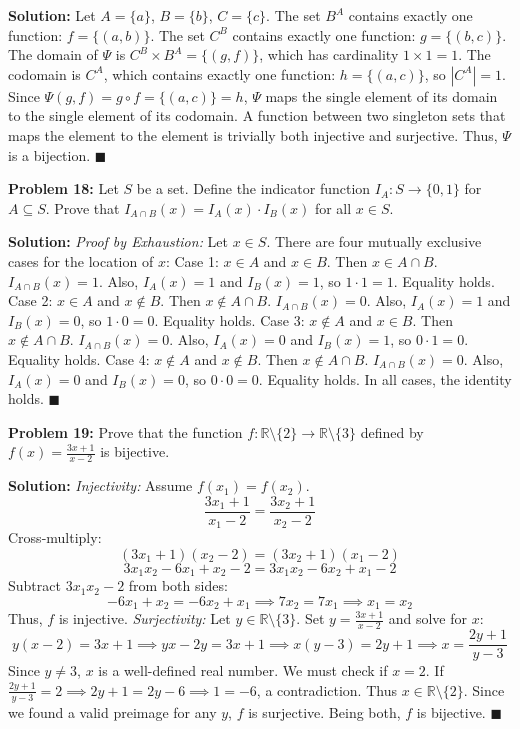 \documentclass[11pt, letterpaper]{article}
\theoremstyle{definition}
\theoremstyle{remark}
\newcommand{\R}{\mathbb{R}}
\begin{document}
\textbf{Solution:}
Let $A = \{a\}$, $B = \{b\}$, $C = \{c\}$. 
The set $B^A$ contains exactly one function: $f = \{(a, b)\}$.
The set $C^B$ contains exactly one function: $g = \{(b, c)\}$.
The domain of $\Psi$ is $C^B \times B^A = \{(g, f)\}$, which has cardinality $1 \times 1 = 1$.
The codomain is $C^A$, which contains exactly one function: $h = \{(a, c)\}$, so $|C^A| = 1$.
Since $\Psi(g, f) = g \circ f = \{(a, c)\} = h$, $\Psi$ maps the single element of its domain to the single element of its codomain. A function between two singleton sets that maps the element to the element is trivially both injective and surjective. Thus, $\Psi$ is a bijection. \hfill $\blacksquare$

\vspace{1em}
\textbf{Problem 18:} Let $S$ be a set. Define the indicator function $I_A: S \to \{0, 1\}$ for $A \subseteq S$. Prove that $I_{A \cap B}(x) = I_A(x) \cdot I_B(x)$ for all $x \in S$.

\textbf{Solution:}
\textit{Proof by Exhaustion:} Let $x \in S$. There are four mutually exclusive cases for the location of $x$:
Case 1: $x \in A$ and $x \in B$. Then $x \in A \cap B$. $I_{A \cap B}(x) = 1$. Also, $I_A(x) = 1$ and $I_B(x) = 1$, so $1 \cdot 1 = 1$. Equality holds.
Case 2: $x \in A$ and $x \notin B$. Then $x \notin A \cap B$. $I_{A \cap B}(x) = 0$. Also, $I_A(x) = 1$ and $I_B(x) = 0$, so $1 \cdot 0 = 0$. Equality holds.
Case 3: $x \notin A$ and $x \in B$. Then $x \notin A \cap B$. $I_{A \cap B}(x) = 0$. Also, $I_A(x) = 0$ and $I_B(x) = 1$, so $0 \cdot 1 = 0$. Equality holds.
Case 4: $x \notin A$ and $x \notin B$. Then $x \notin A \cap B$. $I_{A \cap B}(x) = 0$. Also, $I_A(x) = 0$ and $I_B(x) = 0$, so $0 \cdot 0 = 0$. Equality holds.
In all cases, the identity holds. \hfill $\blacksquare$

\vspace{1em}
\textbf{Problem 19:} Prove that the function $f: \R \setminus \{2\} \to \R \setminus \{3\}$ defined by $f(x) = \frac{3x + 1}{x - 2}$ is bijective.

\textbf{Solution:}
\textit{Injectivity:} Assume $f(x_1) = f(x_2)$.
\[ \frac{3x_1 + 1}{x_1 - 2} = \frac{3x_2 + 1}{x_2 - 2} \]
Cross-multiply:
\[ (3x_1 + 1)(x_2 - 2) = (3x_2 + 1)(x_1 - 2) \]
\[ 3x_1x_2 - 6x_1 + x_2 - 2 = 3x_1x_2 - 6x_2 + x_1 - 2 \]
Subtract $3x_1x_2 - 2$ from both sides:
\[ -6x_1 + x_2 = -6x_2 + x_1 \implies 7x_2 = 7x_1 \implies x_1 = x_2 \]
Thus, $f$ is injective.
\textit{Surjectivity:} Let $y \in \R \setminus \{3\}$. Set $y = \frac{3x + 1}{x - 2}$ and solve for $x$:
\[ y(x - 2) = 3x + 1 \implies yx - 2y = 3x + 1 \implies x(y - 3) = 2y + 1 \implies x = \frac{2y + 1}{y - 3} \]
Since $y \neq 3$, $x$ is a well-defined real number. We must check if $x = 2$. If $\frac{2y + 1}{y - 3} = 2 \implies 2y + 1 = 2y - 6 \implies 1 = -6$, a contradiction. Thus $x \in \R \setminus \{2\}$. Since we found a valid preimage for any $y$, $f$ is surjective. Being both, $f$ is bijective. \hfill $\blacksquare$
\end{document}
